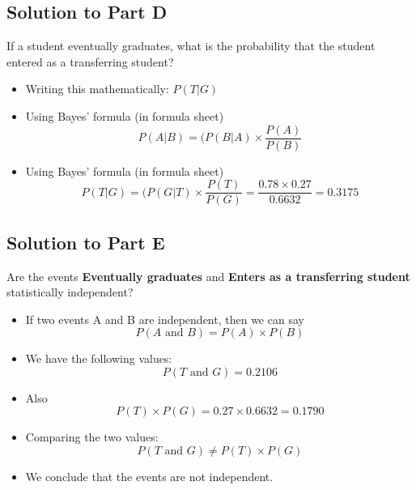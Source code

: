 \documentclass[a4paper,12pt]{article}
\begin{document}
\subsection*{Solution to Part D}
\noindent If a student eventually graduates, what is the probability that the student entered
as a transferring student?
\begin{itemize}
	\item Writing this mathematically: $P(T|G)$
	\item Using Bayes' formula (in formula sheet)
	\[P(A|B)=  {(P(B|A)\times \frac{P(A)}{ P(B)}} \]
	\item Using Bayes' formula (in formula sheet)
	\[P(T|G)=  {(P(G|T)\times \frac{P(T)}{P(G)}} = \frac{0.78 \times 0.27}{0.6632} = 0.3175 \]
\end{itemize}

\subsection*{Solution to Part E}
\noindent Are the events \textbf{Eventually graduates} and \textbf{Enters as a transferring student}
statistically independent?

\begin{itemize}
	\item If two events A and B are independent, then we can say
	\[P(A \mbox{ and } B) = P(A) \times P(B)\] 
	\item We have the following values:
	\[P(T \mbox{ and } G) = 0.2106\]
	\item Also
	\[P(T) \times P(G) = 0.27 \times 0.6632 = 0.1790\]
	\item Comparing the two values:
	\[P(T \mbox{ and } G) \neq P(T) \times P(G)\] 
	\item We conclude that the events are not independent.
\end{itemize}

			
	
\end{document}

